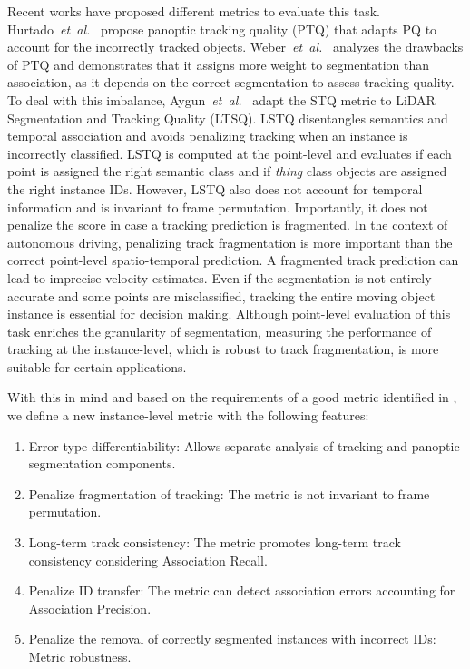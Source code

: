 \documentclass[letterpaper, 10 pt, journal, twoside]{IEEEtran}
\begin{document}
Recent works have proposed different metrics to evaluate this task. Hurtado~\textit{et~al.}~\cite{hurtado2020mopt} propose panoptic tracking quality (PTQ) that adapts PQ to account for the incorrectly tracked objects. Weber~\textit{et~al.}~\cite{weber2021step} analyzes the drawbacks of PTQ and demonstrates that it assigns more weight to segmentation than association, as it depends on the correct segmentation to assess tracking quality. To deal with this imbalance, Aygun~\textit{et~al.}~\cite{aygun20214d} adapt the STQ metric to LiDAR Segmentation and Tracking Quality (LTSQ). LSTQ disentangles semantics and temporal association and avoids penalizing tracking when an instance is incorrectly classified. LSTQ is computed at the point-level and evaluates if each point is assigned the right semantic class and if \emph{thing} class objects are assigned the right instance IDs. However, LSTQ also does not account for temporal information and is invariant to frame permutation. Importantly, it does not penalize the score in case a tracking prediction is fragmented. In the context of autonomous driving, penalizing track fragmentation is more important than the correct point-level spatio-temporal prediction. A fragmented track prediction can lead to imprecise velocity estimates. Even if the segmentation is not entirely accurate and some points are misclassified, tracking the entire moving object instance is essential for decision making. Although point-level evaluation of this task enriches the granularity of segmentation, measuring the performance of tracking at the instance-level, which is robust to track fragmentation, is more suitable for certain applications. 

With this in mind and based on the requirements of a good metric identified in \cite{weber2021step}, we define a new instance-level metric with the following features:
\begin{enumerate}
    \item Error-type differentiability: Allows separate analysis of tracking and panoptic segmentation components.
    \item Penalize fragmentation of tracking: The metric is not invariant to frame permutation.
    \item Long-term track consistency: The metric promotes long-term track consistency considering Association Recall.
    \item Penalize ID transfer: The metric can detect association errors accounting for Association Precision.
    \item Penalize the removal of correctly segmented instances with incorrect IDs: Metric robustness.
\end{enumerate}
\end{document}
